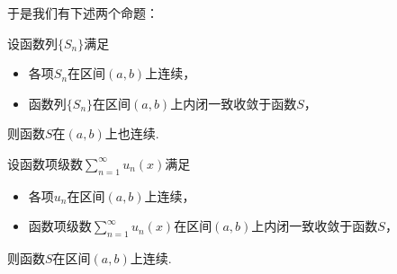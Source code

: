 于是我们有下述两个命题：
\begin{proposition}
设函数列\(\{S_n\}\)满足\begin{itemize}
	\item 各项\(S_n\)在区间\((a,b)\)上连续，
	\item 函数列\(\{S_n\}\)在区间\((a,b)\)上内闭一致收敛于函数\(S\)，
\end{itemize}
则函数\(S\)在\((a,b)\)上也连续.
\end{proposition}
\begin{proposition}
设函数项级数\(\sum_{n=1}^\infty u_n(x)\)满足\begin{itemize}
	\item 各项\(u_n\)在区间\((a,b)\)上连续，
	\item 函数项级数\(\sum_{n=1}^\infty u_n(x)\)在区间\((a,b)\)上内闭一致收敛于函数\(S\)，
\end{itemize}
则函数\(S\)在区间\((a,b)\)上连续.
\end{proposition}


